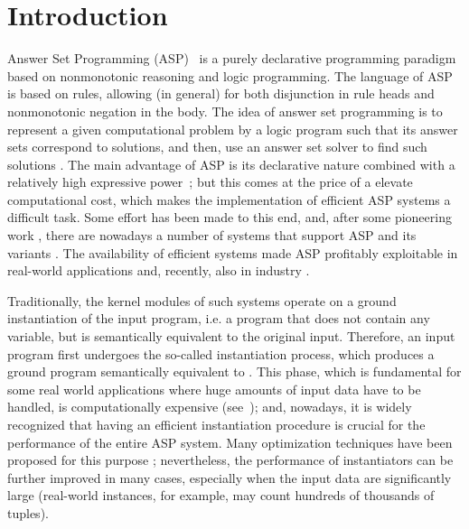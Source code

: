 \documentclass[preprint]{tlp}
\begin{document}
\section{Introduction}\label{sec:introduction}
Answer Set Programming (ASP)~\cite{gelf-lifs-91,eite-etal-97f,lifs-99a,mare-trus-99,bara-2002,gelf-leon-02}
is a purely declarative programming paradigm based on nonmonotonic
reasoning and logic programming.
The language of ASP is based on rules, allowing (in general)
for both disjunction in rule heads and nonmonotonic negation in the body.
The idea of answer set programming is
to represent a given computational problem by a logic program such that its
answer sets correspond to solutions, and then, use an answer set solver
to find such solutions \cite{lifs-99a}.
The main advantage of ASP is its declarative nature combined with a
relatively high expressive power~\cite{leon-etal-2002-dlv,dant-etal-01}; but this comes at
the price of a elevate computational cost, which makes the
implementation of efficient ASP systems a difficult task.
Some effort has been made to this end, and, after some pioneering work
\cite{bell-etal-94,subr-etal-95}, there are nowadays a number of
systems that support ASP and its variants
\cite{leon-etal-2002-dlv,janh-etal-2005-tocl,simo-etal-2002,gebs-etal-2007-ijcai,lin-zhao-2004,lier-mara-2004-lpnmr,ange-etal-2001}. The availability of efficient systems made ASP profitably exploitable in real-world applications \cite{lemb-etal-02b,aiel-mass-2000,bara-uyan-2001}
and, recently, also in industry \cite{Grasso-etal-2010,ielpa-etal,Grasso-etal-2011}.

Traditionally, the kernel modules of such systems operate on a ground
instantiation of the input program, i.e. a program that does not
contain any variable, but is semantically equivalent to the
original input.
Therefore, an input program  first undergoes the so-called instantiation
process, which produces a ground program  semantically equivalent to .
This phase, which is fundamental for some real world applications where huge amounts of input data have to be handled, is computationally expensive (see~\cite{eite-etal-97f,dant-etal-01});
and, nowadays, it is widely recognized that having an efficient instantiation procedure is
crucial for the performance of the entire ASP system.
Many optimization techniques have
been proposed for this purpose
\cite{fabe-etal-99c,leon-etal-2001a,perr-etal-2004-nmr};
nevertheless, the performance of instantiators can be further improved
in many cases, especially when the input data are
significantly large (real-world instances, for example, may count
hundreds of thousands of tuples).
\end{document}
